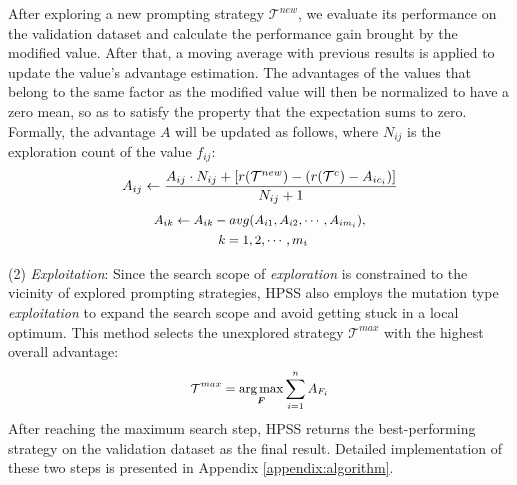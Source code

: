 After exploring a new prompting strategy $\mathcal{T}^{new}$, we evaluate its performance on the validation dataset and calculate the performance gain brought by the modified value. 
After that, a moving average with previous results is applied to update the value's advantage estimation. 
The advantages of the values that belong to the same factor as the modified value will then be normalized to have a zero mean, so as to satisfy the property that the expectation sums to zero.
Formally, 
the advantage $A$ will be updated as follows, where $N_{ij}$ is the exploration count of the value $f_{ij}$:
\begin{equation}
\label{update_1}
\small
A_{ij} \leftarrow \frac{A_{ij} \cdot N_{ij} + [r(\mathcal{T}^{new}) - (r(\mathcal{T}^{c}) - A_{ic_{i}})]}{N_{ij} + 1}
\end{equation}
\begin{equation}
\small
\label{update_2}
\begin{aligned}
& A_{ik} \leftarrow A_{ik} - avg(A_{i1}, A_{i2}, \cdots, A_{i{m_i}}), \\
& \hspace{5.em} k=1,2,\cdots,m_i
\end{aligned}
\end{equation}

\noindent (2) \textit{Exploitation}: %
Since the search scope of \textit{exploration} is constrained to the vicinity of explored prompting strategies, HPSS also employs the mutation type \textit{exploitation} to expand the search scope and avoid getting stuck in a local optimum. 
This method selects the unexplored strategy $\mathcal{T}^{max}$ with the highest overall advantage:
\begin{equation}
\label{exploitation}
\small
\mathcal{T}^{max} = \mathop{\arg\max}\limits_{\boldsymbol{F}}\sum_{i=1}^{n} A_{F_i}
\end{equation}
After reaching the maximum search step, HPSS returns the best-performing strategy on the validation dataset as the final result. 
Detailed implementation of these two steps is presented in Appendix \ref{appendix:algorithm}.